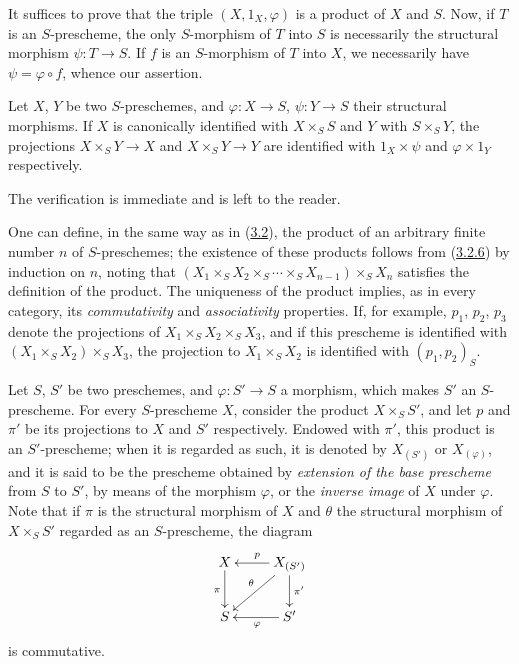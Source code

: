 It suffices to prove that the triple $(X,1_X,\varphi)$ is a product of $X$
and $S$. Now, if $T$ is an $S$-prescheme, the only $S$-morphism of $T$ into
$S$ is necessarily the structural morphism $\psi:T\to S$. If $f$ is
an $S$-morphism of $T$ into $X$, we necessarily have
$\psi=\varphi\circ f$, whence our assertion.

\begin{corollary}[3.3.4]
\label{I.3.3.4}
Let $X$, $Y$ be two $S$-preschemes, and $\varphi:X\to S$, $\psi:Y\to S$ their
structural morphisms. If $X$ is canonically identified with $X\times_S S$
and $Y$ with $S\times_S Y$, the projections $X\times_S Y\to X$ and
$X\times_S Y\to Y$ are identified with $1_X\times\psi$ and
$\varphi\times 1_Y$ respectively.
\end{corollary}

The verification is immediate and is left to the reader.

\begin{env}[3.3.5]
\label{I.3.3.5}
One can define, in the same way as in
(\hyperref[subsection:I.3.2]{3.2}), the product of an
arbitrary finite number $n$ of $S$-preschemes; the existence of these products
follows from (\hyperref[I.3.2.6]{3.2.6}) by induction on $n$, noting
that
$(X_1\times_S X_2\times_S\cdots\times_S X_{n-1})\times_S X_n$ satisfies
the definition of the product. The uniqueness of the product implies, as in
every category, its \emph{commutativity} and \emph{associativity} properties.
If, for example, $p_1$, $p_2$, $p_3$ denote the projections of
$X_1\times_S X_2\times_S X_3$, and if this prescheme is identified with
$(X_1\times_S X_2)\times_S X_3$, the projection to $X_1\times_S X_2$ is
identified with $(p_1,p_2)_S$.
\end{env}

\begin{env}[3.3.6]
\label{I.3.3.6}
Let $S$, $S'$ be two preschemes, and $\varphi:S'\to S$ a morphism, which makes
$S'$ an $S$-prescheme. For every $S$-prescheme $X$, consider the product
$X\times_S S'$, and let $p$ and $\pi'$ be its projections to $X$ and $S'$
respectively. Endowed with $\pi'$, this product is an $S'$-prescheme; when it
is regarded as such, it is denoted by $X_{(S')}$ or $X_{(\varphi)}$, and it is
said to be the prescheme obtained by \emph{extension of the base prescheme} from
$S$ to $S'$, by means of the morphism $\varphi$, or the \emph{inverse image} of
$X$ under $\varphi$. Note that if $\pi$ is the structural morphism of $X$ and
$\theta$ the structural morphism of $X\times_S S'$ regarded as an
$S$-prescheme, the diagram
\label{I.3.3.6.base-change-diagram}
\[
  \xymatrix{
    X\ar[d]_{\pi} &
    X_{(S')}\ar[l]_{p}\ar[ld]_{\theta}\ar[d]^{\pi'}\\
    S & S'\ar[l]^{\varphi}
  }
\]
is commutative.
\end{env}

